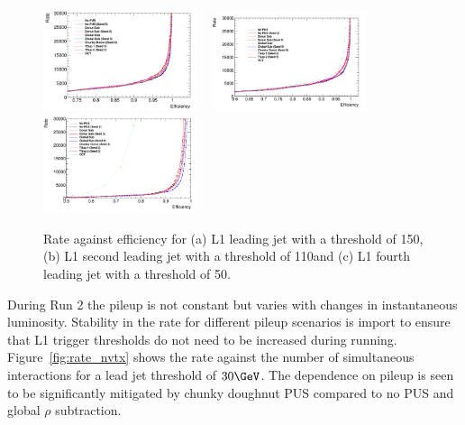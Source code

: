 \begin{figure}[h!]
  \centering
    \includegraphics[width=0.4\textwidth]{./Figures/triggerUpgrade/singleJet_150.png}~~
    \includegraphics[width=0.4\textwidth]{./Figures/triggerUpgrade/doubleJet_110.png}\\
    \includegraphics[width=0.4\textwidth]{./Figures/triggerUpgrade/quadJet_50.png}
  \caption{\label{fig:rate_eff_jets} Rate against efficiency for (a) L1 leading jet with a threshold of 150\GeG, 
  (b) L1 second leading jet with a threshold of 110\GeV and (c) L1 fourth leading jet with a threshold of 50\GeV.}
\end{figure}

During Run 2 the pileup is not constant but varies with changes in instantaneous luminosity. 
Stability in the rate for different pileup scenarios is import to ensure that L1 trigger thresholds 
do not need to be increased during running. Figure~\ref{fig:rate_nvtx} shows the rate against the number of 
simultaneous interactions for a lead jet threshold of $30\GeV$. The dependence on pileup is 
seen to be significantly mitigated by chunky doughnut PUS compared to no PUS and global $\rho$
subtraction. 

